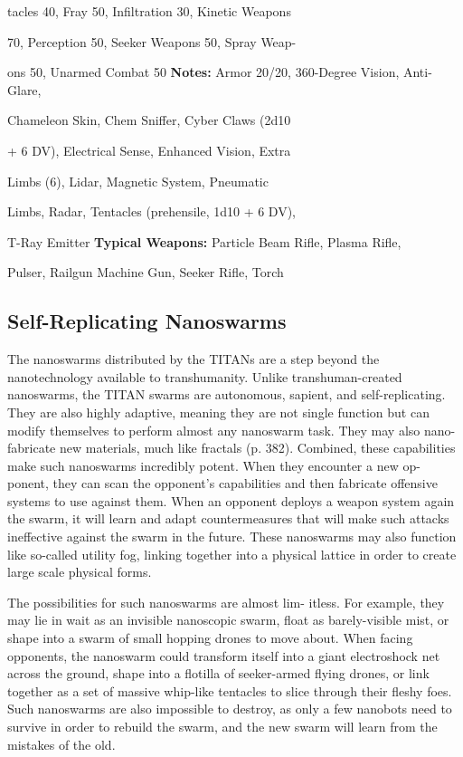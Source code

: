 tacles 40, Fray 50, Infiltration 30, Kinetic Weapons 

70, Perception 50, Seeker Weapons 50, Spray Weap-

ons 50, Unarmed Combat 50
\textbf{Notes:} Armor 20/20, 360-Degree Vision, Anti-Glare, 

Chameleon Skin, Chem Sniffer, Cyber Claws (2d10 

+ 6 DV), Electrical Sense, Enhanced Vision, Extra 

Limbs (6), Lidar, Magnetic System, Pneumatic 

Limbs, Radar, Tentacles (prehensile, 1d10 + 6 DV), 

T-Ray Emitter
\textbf{Typical Weapons:} Particle Beam Rifle, Plasma Rifle, 

Pulser, Railgun Machine Gun, Seeker Rifle, Torch

\subsection{Self-Replicating Nanoswarms}

The nanoswarms distributed by the TITANs are a step 
beyond the nanotechnology available to transhumanity. 
Unlike transhuman-created nanoswarms, the TITAN 
swarms are autonomous, sapient, and self-replicating. 
They are also highly adaptive, meaning they are not 
single function but can modify themselves to perform 
almost any nanoswarm task. They may also nano-
fabricate new materials, much like fractals (p. 382). 
Combined, these capabilities make such nanoswarms 
incredibly potent. When they encounter a new op-
ponent, they can scan the opponent's capabilities and 
then fabricate offensive systems to use against them. 
When an opponent deploys a weapon system again the 
swarm, it will learn and adapt countermeasures that 
will make such attacks ineffective against the swarm in 
the future. These nanoswarms may also function like 
so-called utility fog, linking together into a physical 
lattice in order to create large scale physical forms.

The possibilities for such nanoswarms are almost lim-
itless. For example, they may lie in wait as an invisible 
nanoscopic swarm, float as barely-visible mist, or shape 
into a swarm of small hopping drones to move about. 
When facing opponents, the nanoswarm could transform 
itself into a giant electroshock net across the ground, 
shape into a flotilla of seeker-armed flying drones, or 
link together as a set of massive whip-like tentacles to 
slice through their fleshy foes. Such nanoswarms are 
also impossible to destroy, as only a few nanobots need 
to survive in order to rebuild the swarm, and the new 
swarm will learn from the mistakes of the old.

